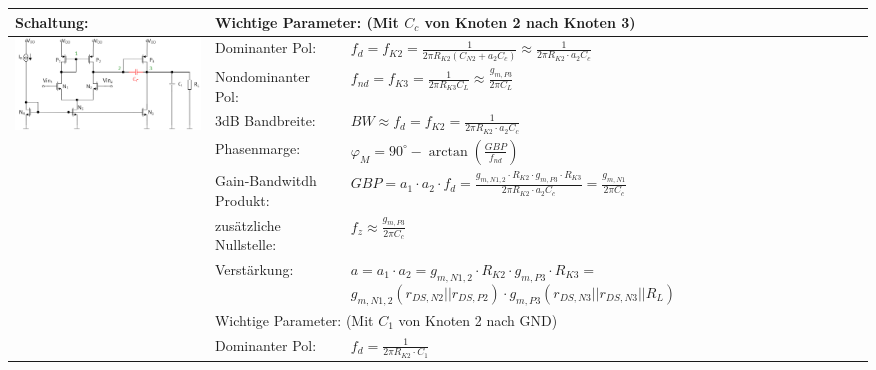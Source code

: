 \begin{tabular}{|l|l|l|}
\hline
Schaltung: & \multicolumn{2}{l|}{Wichtige Parameter: (Mit $C_c$ von Knoten 2 nach Knoten 3)} \\
\hline
\multirow{7}{*}{\includegraphics[width=6cm]{Miller OTA.png}} & Dominanter Pol: & $f_{d} = f_{K2} = \frac{1}{2\pi R_{K2}(C_{N2}+a_2C_c)} \approx \frac{1}{2\pi R_{K2}\cdot a_2C_c}$\\
\cline{2-3}
                  & Nondominanter Pol: & $f_{nd} = f_{K3} = \frac{1}{2\pi R_{K3}C_L}\approx\frac{g_{m,P3}}{2\pi C_L}$\\
\cline{2-3}
                  & 3dB Bandbreite: & $BW\approx f_d = f_{K2} = \frac{1}{2\pi R_{K2}\cdot a_2C_c}$\\
\cline{2-3}
                  & Phasenmarge: & $\varphi_M = 90^\circ-\arctan(\frac{GBP}{f_{nd}})$\\
\cline{2-3}
                  & \makecell[l]{Gain-Bandwitdh\\ Produkt:} & $GBP = a_1\cdot a_2\cdot f_d = \frac{g_{m,N1,2}\cdot R_{K2}\cdot g_{m,P3}\cdot R_{K3}}{2\pi R_{K2}\cdot a_2C_c} = \frac{g_{m,N1}}{2\pi C_c}$\\
\cline{2-3}
                  & zusätzliche Nullstelle: & $f_z \approx \frac{g_{m,P3}}{2\pi C_c}$\\
\cline{2-3}
                  & Verstärkung: & \makecell[l]{$a = a_1\cdot a_2 = g_{m,N1,2}\cdot R_{K2}\cdot g_{m,P3}\cdot R_{K3} = $\\$g_{m,N1,2}(r_{DS,N2}||r_{DS,P2})\cdot g_{m,P3}(r_{DS,N3}||r_{DS,N3}||R_L)$}\\
\cline{2-3}
                  & \multicolumn{2}{l|}{Wichtige Parameter: (Mit $C_1$ von Knoten 2 nach GND)}\\
\cline{2-3}
                 & Dominanter Pol: & $f_{d} = \frac{1}{2\pi R_{K2}\cdot C_1}$\\
\hline
\end{tabular}
\newpage

